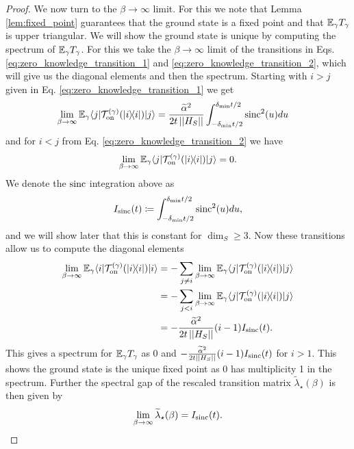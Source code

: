 \begin{proof}
    We now turn to the $\beta \to \infty$ limit. For this we note that Lemma \ref{lem:fixed_point} guarantees that the ground state is a fixed point and that $\mathbb{E}_\gamma T_\gamma$ is upper triangular. We will show the ground state is unique by computing the spectrum of $\mathbb{E}_\gamma T_\gamma$. For this we take the $\beta \to \infty$ limit of the transitions in Eqs. \eqref{eq:zero_knowledge_transition_1} and \eqref{eq:zero_knowledge_transition_2}, which will give us the diagonal elements and then the spectrum. Starting with $i > j$ given in Eq. \eqref{eq:zero_knowledge_transition_1} we get
    \begin{align}
        \lim_{\beta \to \infty} \mathbb{E}_\gamma \langle j| \mathcal{T}_{\rm on}^{(\gamma)}(| i\rangle\! \langle i|)|j\rangle &= \frac{\widetilde{\alpha}^2}{2 t \left| \left| H_S \right| \right|} \int_{-\delta_{\min}t/2}^{\delta_{\min}t/2} \operatorname{sinc}^2(u) du
    \end{align}
    and for $i < j$ from Eq. \eqref{eq:zero_knowledge_transition_2} we have
    \begin{equation}
        \lim_{\beta \to \infty} \mathbb{E}_\gamma \langle j| \mathcal{T}_{\rm on}^{(\gamma)}(| i\rangle\! \langle i|)|j\rangle = 0.
    \end{equation}
    We denote the $\operatorname{sinc}$ integration above as
    \begin{equation}
        I_{\operatorname{sinc}}(t) \coloneqq \int_{-\delta_{\min}t/2}^{\delta_{\min} t/2} \operatorname{sinc}^2(u) du,
    \end{equation}
    and we will show later that this is constant for $\dim_S \ge 3$. Now these transitions allow us to compute the diagonal elements
    \begin{align}
        \lim_{\beta \to \infty} \mathbb{E}_\gamma \langle i| \mathcal{T}_{\rm on}^{(\gamma)}(| i\rangle\! \langle i|) |i\rangle &= - \sum_{j \neq i} \lim_{\beta \to \infty} \mathbb{E}_\gamma \langle j| \mathcal{T}_{\rm on}^{(\gamma)}(| i\rangle\! \langle i|) |j\rangle \\
        &= - \sum_{j < i} \lim_{\beta \to \infty} \mathbb{E}_\gamma \langle j| \mathcal{T}_{\rm on}^{(\gamma)}(| i\rangle\! \langle i|) |j\rangle \\
        &= - \frac{\widetilde{\alpha}^2}{2 t \left| \left| H_S \right| \right|} (i - 1) I_{\operatorname{sinc}}(t).
    \end{align}
    This gives a spectrum for $\mathbb{E}_\gamma T_\gamma$ as 0 and $- \frac{\widetilde{\alpha}^2}{2 t \left| \left| H_S \right| \right|} (i - 1) I_{\operatorname{sinc}}(t)$ for $i > 1$. This shows the ground state is the unique fixed point as 0 has multiplicity 1 in the spectrum. Further the spectral gap of the rescaled transition matrix $\widetilde{\lambda}_\star(\beta)$ is then given by
    \begin{equation}
        \lim_{\beta \to \infty} \widetilde{\lambda}_\star(\beta) = I_{\sinc}(t).

\end{equation}
\end{proof}

